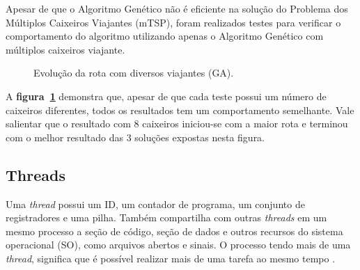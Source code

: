 \documentclass[12pt,openright,a4paper,oneside]{tcc}
\begin{document}
		Apesar de que o Algoritmo Genético não é eficiente na solução do Problema dos Múltiplos Caixeiros Viajantes (mTSP), foram realizados testes para verificar o comportamento do algoritmo utilizando apenas o Algoritmo Genético com múltiplos caixeiros viajante.

		\begin{figure}[h]
			\centering
            \caption{Evolução da rota com diversos viajantes (GA).}
			\label{figgaga}
		\end{figure}

		A \textbf{figura~\ref{figgaga}} demonstra que, apesar de que cada teste possui um número de caixeiros diferentes, todos os resultados tem um comportamento semelhante. Vale salientar que o resultado com 8 caixeiros iniciou-se com a maior rota e terminou com o melhor resultado das 3 soluções expostas nesta figura.

		\subsection{Threads}

		Uma \textit{thread} possui um ID, um contador de programa, um conjunto de registradores e uma pilha. Também compartilha com outras \textit{threads} em um mesmo processo a seção de código, seção de dados e outros recursos do sistema operacional (SO), como arquivos abertos e sinais. 
		O processo tendo mais de uma \textit{thread}, significa que é possível realizar mais de uma tarefa ao mesmo tempo \cite{THREAD}.		
		\newpage
\end{document}
